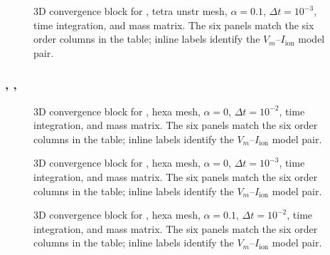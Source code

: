 \begin{figure}[p]
\centering
{}
\caption{3D convergence block for , tetra unstr mesh, $\alpha=0.1$, $\Delta t=10^{-3}$,  time integration, and  mass matrix. The six panels match the six order columns in the table; inline labels identify the $V_m$--$I_{\mathrm{ion}}$ model pair.}
\label{fig:results-3d-diagonaliion-triangular-unstr-alpha-1p0em01-1p0em03}
\end{figure}
\FloatBarrier

\subsubsection{, , }



\begin{figure}[p]
\centering
{}
\caption{3D convergence block for , hexa mesh, $\alpha=0$, $\Delta t=10^{-2}$,  time integration, and  mass matrix. The six panels match the six order columns in the table; inline labels identify the $V_m$--$I_{\mathrm{ion}}$ model pair.}
\label{fig:results-3d-jfnk-hexa-alpha-0p0e00-1p0em02}
\end{figure}
\FloatBarrier

\begin{figure}[p]
\centering
{}
\caption{3D convergence block for , hexa mesh, $\alpha=0$, $\Delta t=10^{-3}$,  time integration, and  mass matrix. The six panels match the six order columns in the table; inline labels identify the $V_m$--$I_{\mathrm{ion}}$ model pair.}
\label{fig:results-3d-jfnk-hexa-alpha-0p0e00-1p0em03}
\end{figure}
\FloatBarrier

\begin{figure}[p]
\centering
{}
\caption{3D convergence block for , hexa mesh, $\alpha=0.1$, $\Delta t=10^{-2}$,  time integration, and  mass matrix. The six panels match the six order columns in the table; inline labels identify the $V_m$--$I_{\mathrm{ion}}$ model pair.}
\label{fig:results-3d-jfnk-hexa-alpha-1p0em01-1p0em02}
\end{figure}
\FloatBarrier

